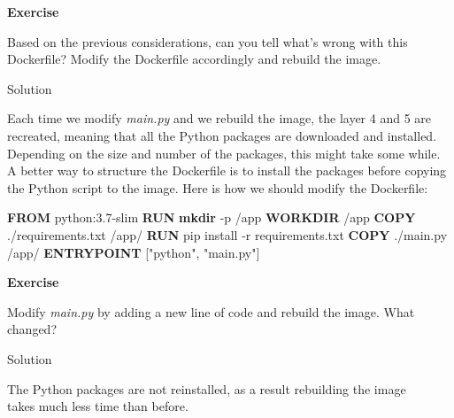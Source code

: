 \documentclass[
]{article}
\newenvironment{Shaded}{\begin{snugshade}}{\end{snugshade}}
\newcommand{\AttributeTok}[1]{\textcolor[rgb]{0.13,0.29,0.53}{#1}}
\newcommand{\ExtensionTok}[1]{#1}
\newcommand{\FunctionTok}[1]{\textcolor[rgb]{0.13,0.29,0.53}{\textbf{#1}}}
\newcommand{\KeywordTok}[1]{\textcolor[rgb]{0.13,0.29,0.53}{\textbf{#1}}}
\newcommand{\NormalTok}[1]{#1}
\newcommand{\StringTok}[1]{\textcolor[rgb]{0.31,0.60,0.02}{#1}}
\newenvironment{infobox}[1]
  {
  \begin{itemize}
  \renewcommand{\labelitemi}{
    \raisebox{-.7\height}[0pt][0pt]{
      
    }
  }
  \setlength{\fboxsep}{1em}
  \begin{whitebox}
  \item
  }
  {
  \end{whitebox}
  \end{itemize}
  }
\theoremstyle{definition}
\theoremstyle{definition}
\theoremstyle{definition}
\theoremstyle{remark}
\let\BeginKnitrBlock\begin \let\EndKnitrBlock\end
\begin{document}
\begin{infobox}{exercisebox}

\textbf{Exercise}

\BeginKnitrBlock{exercise}
\label{exr:unnamed-chunk-23}{\label{exr:unnamed-chunk-23} }Based on the previous considerations,
can you tell what's wrong with this Dockerfile?
Modify the Dockerfile accordingly and rebuild the image.
\EndKnitrBlock{exercise}

\end{infobox}

Solution

\begin{infobox}{exercisebox}

Each time we modify \emph{main.py} and we rebuild the image,
the layer 4 and 5 are recreated, meaning that all the Python packages
are downloaded and installed.
Depending on the size and number of the packages, this might
take some while.
A better way to structure the Dockerfile is to install the
packages before copying the Python script to the image.
Here is how we should modify the Dockerfile:

\begin{Shaded}
\begin{Highlighting}[]
\KeywordTok{FROM}\NormalTok{ python:3.7{-}slim}
\KeywordTok{RUN} \FunctionTok{mkdir} \AttributeTok{{-}p}\NormalTok{ /app}
\KeywordTok{WORKDIR}\NormalTok{ /app}
\KeywordTok{COPY}\NormalTok{ ./requirements.txt /app/}
\KeywordTok{RUN} \ExtensionTok{pip}\NormalTok{ install }\AttributeTok{{-}r}\NormalTok{ requirements.txt}
\KeywordTok{COPY}\NormalTok{ ./main.py /app/}
\KeywordTok{ENTRYPOINT}\NormalTok{ [}\StringTok{"python"}\NormalTok{, }\StringTok{"main.py"}\NormalTok{]}
\end{Highlighting}
\end{Shaded}

\end{infobox}

\begin{infobox}{exercisebox}

\textbf{Exercise}

\BeginKnitrBlock{exercise}
\label{exr:unnamed-chunk-24}{\label{exr:unnamed-chunk-24} }Modify \emph{main.py} by adding a new line of code and rebuild the image.
What changed?
\EndKnitrBlock{exercise}

\end{infobox}

Solution

\begin{infobox}{exercisebox}
The Python packages are not reinstalled, as a result rebuilding the image\\
takes much less time than before.

\end{infobox}
\end{document}
